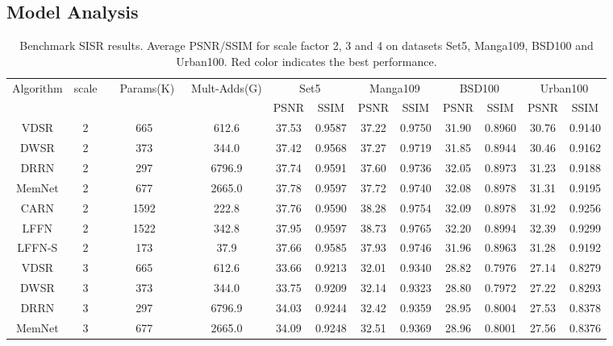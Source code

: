 \documentclass[journal]{IEEEtran}
\begin{document}
\subsection{Model Analysis}
\renewcommand\arraystretch{1}
\begin{table*}[!ht]
\centering
\caption{\small Benchmark SISR results. Average PSNR/SSIM for scale factor 2, 3 and 4 on datasets  Set5, Manga109, BSD100 and Urban100. Red color indicates the best performance.}
\begin{tabular}{|c|c|c|c|cc|cc|cc|cc|}
\hline
    \multirow{2}[2]{*}{Algorithm} & \multirow{2}[2]{*}{scale} & \multirow{2}[2]{*}{ {\ \ Params(K)\ }} & \multirow{2}[2]{*}{Mult-Adds(G)} & \multicolumn{2}{c|}{Set5} & \multicolumn{2}{c|}{Manga109} & \multicolumn{2}{c|}{BSD100} & \multicolumn{2}{c|}{Urban100} \\
          &       &       &       & PSNR  & SSIM  & PSNR  & SSIM  & PSNR  & SSIM  & PSNR  & SSIM \\
\hline
\hline
VDSR \cite{Kim2016Accurate}& 2 & 665 & 612.6 & 37.53& 0.9587& 37.22& 0.9750& 31.90& 0.8960& 30.76& 0.9140\\
DWSR \cite{guo2017deep}& 2 & 373 & 344.0 & 37.42& 0.9568& 37.27 & 0.9719 & 31.85& 0.8944& 30.46& 0.9162\\
DRRN \cite{tai2017image}& 2 & 297 & 6796.9 & 37.74& 0.9591& 37.60& 0.9736& 32.05& 0.8973& 31.23& 0.9188\\
MemNet \cite{tai2017memnet}& 2 & 677 & 2665.0 & 37.78& 0.9597& 37.72& 0.9740& 32.08& 0.8978& 31.31& 0.9195\\
CARN \cite{ahn2018fast}& 2 & 1592 & 222.8 & 37.76& 0.9590& 38.28& 0.9754& 32.09&0.8978& 31.92&  0.9256\\
LFFN & 2 & 1522 & 342.8 & \color{red}37.95&\color{red} 0.9597&\color{red} 38.73& \color{red}0.9765&\color{red} 32.20& \color{red}0.8994& \color{red}32.39&\color{red}0.9299\\
LFFN-S & 2 & 173 & 37.9 & 37.66& 0.9585&37.93& 0.9746& 31.96& 0.8963& 31.28& 0.9192\\
\hline
\hline
VDSR \cite{Kim2016Accurate}& 3 & 665 & 612.6 & 33.66& 0.9213& 32.01& 0.9340& 28.82& 0.7976& 27.14& 0.8279\\
DWSR \cite{guo2017deep}& 3 & 373 & 344.0 & 33.75& 0.9209& 32.14 & 0.9323 & 28.80& 0.7972& 27.22& 0.8293\\
DRRN \cite{tai2017image}&3 & 297 & 6796.9 & 34.03& 0.9244&32.42& 0.9359& 28.95& 0.8004& 27.53& 0.8378\\
MemNet \cite{tai2017memnet}&3 & 677 & 2665.0 & 34.09& 0.9248& 32.51& 0.9369& 28.96& 0.8001& 27.56& 0.8376\\

\end{tabular}
\end{table*}
\end{document}
